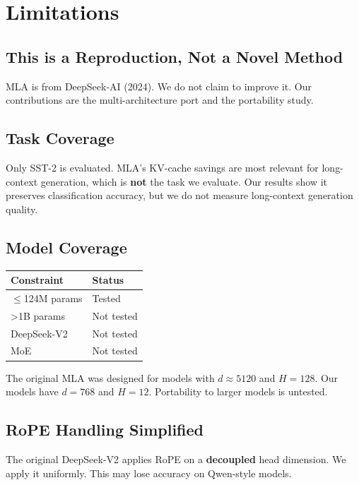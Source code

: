 
\section{Limitations}

\subsection{This is a Reproduction, Not a Novel Method}

MLA is from DeepSeek-AI (2024). We do not claim to improve it. Our 
contributions are the multi-architecture port and the portability study.

\subsection{Task Coverage}

Only SST-2 is evaluated. MLA's KV-cache savings are most relevant for 
long-context generation, which is \textbf{not} the task we evaluate. Our results 
show it preserves classification accuracy, but we do not measure 
long-context generation quality.

\subsection{Model Coverage}

\begin{table}[H]
\centering
\small
\begin{tabular}{ll}
\toprule
\textbf{Constraint} & \textbf{Status} \\
\midrule
$\le$124M params & Tested \\
>1B params & Not tested \\
DeepSeek-V2 & Not tested \\
MoE & Not tested \\
\bottomrule
\end{tabular}
\end{table}

The original MLA was designed for models with $d \approx 5120$ and 
$H = 128$. Our models have $d = 768$ and $H = 12$. Portability to 
larger models is untested.

\subsection{RoPE Handling Simplified}

The original DeepSeek-V2 applies RoPE on a \textbf{decoupled} head dimension. We 
apply it uniformly. This may lose accuracy on Qwen-style models.

